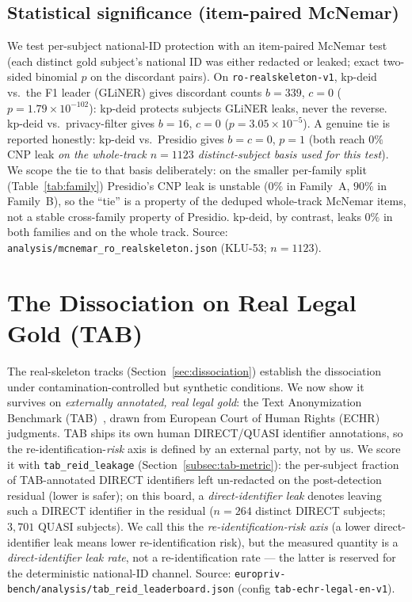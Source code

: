 \documentclass[11pt]{article}
\begin{document}
\subsection{Statistical significance (item-paired McNemar)}
We test per-subject national-ID protection with an item-paired McNemar test (each distinct gold
subject's national ID was either redacted or leaked; exact two-sided binomial $p$ on the discordant
pairs). On \texttt{ro-realskeleton-v1}, kp-deid vs.\ the F1 leader (GLiNER) gives discordant counts
$b{=}339$, $c{=}0$ ($p\!=\!1.79\!\times\!10^{-102}$): kp-deid protects subjects GLiNER leaks, never
the reverse. kp-deid vs.\ privacy-filter gives $b{=}16$, $c{=}0$ ($p\!=\!3.05\!\times\!10^{-5}$).
A genuine tie is reported honestly: kp-deid vs.\ Presidio gives $b{=}c{=}0$, $p{=}1$ (both reach
$0\%$ CNP leak \emph{on the whole-track $n{=}1123$ distinct-subject basis used for this test}). We
scope the tie to that basis deliberately: on the smaller per-family split (Table~\ref{tab:family})
Presidio's CNP leak is unstable ($0\%$ in Family~A, $90\%$ in Family~B), so the ``tie'' is a property
of the deduped whole-track McNemar items, not a stable cross-family property of Presidio. kp-deid, by
contrast, leaks $0\%$ in both families and on the whole track. Source:
\texttt{analysis/mcnemar\_ro\_realskeleton.json} (KLU-53; $n{=}1123$).

\section{The Dissociation on Real Legal Gold (TAB)}
\label{sec:tab}

The real-skeleton tracks (Section~\ref{sec:dissociation}) establish the dissociation under
contamination-controlled but synthetic conditions. We now show it survives on \emph{externally
annotated, real legal gold}: the Text Anonymization Benchmark (TAB)~\cite{pilan2022tab}, drawn from
European Court of Human Rights (ECHR) judgments. TAB ships its own human DIRECT/QUASI identifier
annotations, so the re-identification-\emph{risk} axis is defined by an external party, not by us. We
score it with \texttt{tab\_reid\_leakage} (Section~\ref{subsec:tab-metric}): the per-subject fraction
of TAB-annotated DIRECT identifiers left un-redacted on the post-detection residual (lower is safer);
on this board, a \emph{direct-identifier leak} denotes leaving such a DIRECT identifier in the
residual ($n{=}264$ distinct DIRECT subjects; $3{,}701$ QUASI subjects). We call this the
\emph{re-identification-risk axis} (a lower direct-identifier leak means lower re-identification
risk), but the measured quantity is a \emph{direct-identifier leak rate}, not a re-identification
rate --- the latter is reserved for the deterministic national-ID channel. Source:
\texttt{europriv-bench/analysis/tab\_reid\_leaderboard.json} (config \texttt{tab-echr-legal-en-v1}).
\end{document}
